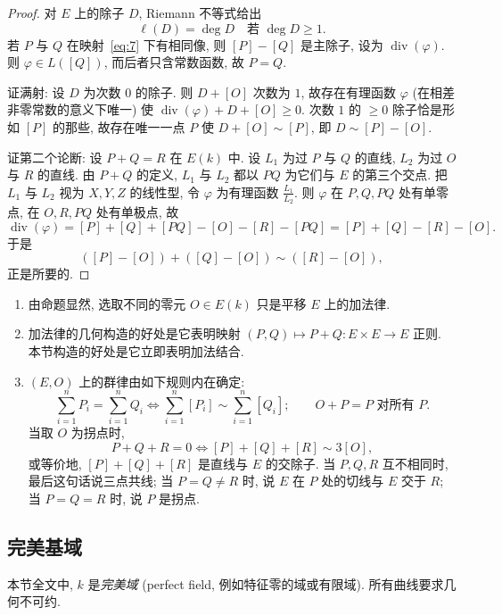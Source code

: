 \begin{proof}
对 $E$ 上的除子 $D$, Riemann 不等式给出
\[
\ell(D) = \deg D \quad \text{若 } \deg D\ge 1.
\]
若 $P$ 与 $Q$ 在映射~\eqref{eq:7} 下有相同像, 则 $[P] - [Q]$ 是主除子, 设为 $\operatorname{div}(\varphi)$. 则 $\varphi\in L([Q])$, 而后者只含常数函数, 故 $P = Q$.

证满射: 设 $D$ 为次数 $0$ 的除子. 则 $D + [O]$ 次数为 $1$, 故存在有理函数 $\varphi$ (在相差非零常数的意义下唯一) 使 $\operatorname{div}(\varphi) + D + [O]\ge 0$. 次数 $1$ 的 $\ge 0$ 除子恰是形如 $[P]$ 的那些, 故存在唯一一点 $P$ 使 $D + [O]\sim[P]$, 即 $D\sim[P] - [O]$.

证第二个论断: 设 $P + Q = R$ 在 $E(k)$ 中. 设 $L_1$ 为过 $P$ 与 $Q$ 的直线, $L_2$ 为过 $O$ 与 $R$ 的直线. 由 $P+Q$ 的定义, $L_1$ 与 $L_2$ 都以 $PQ$ 为它们与 $E$ 的第三个交点. 把 $L_1$ 与 $L_2$ 视为 $X,Y,Z$ 的线性型, 令 $\varphi$ 为有理函数 $\frac{L_1}{L_2}$. 则 $\varphi$ 在 $P, Q, PQ$ 处有单零点, 在 $O, R, PQ$ 处有单极点, 故
\[
\operatorname{div}(\varphi) = [P] + [Q] + [PQ] - [O] - [R] - [PQ] = [P] + [Q] - [R] - [O].
\]
于是
\[
([P] - [O]) + ([Q] - [O]) \sim ([R] - [O]),
\]
正是所要的.
\end{proof}

\begin{remark} \label{thm:1.4.11} 
\begin{enumerate}[label=\textup{(\alph*)}]
\item 由命题显然, 选取不同的零元 $O\in E(k)$ 只是平移 $E$ 上的加法律.
\item 加法律的几何构造的好处是它表明映射 $(P,Q)\mapsto P+Q\colon E\times E\to E$ 正则. 本节构造的好处是它立即表明加法结合.
\item $(E,O)$ 上的群律由如下规则内在确定:
\[
\sum_{i=1}^n P_i = \sum_{i=1}^n Q_i \iff \sum_{i=1}^n[P_i]\sim\sum_{i=1}^n[Q_i]; \qquad
O + P = P \text{ 对所有 } P.
\]
当取 $O$ 为拐点时,
\[
P + Q + R = 0 \iff [P] + [Q] + [R]\sim 3[O],
\]
或等价地, $[P] + [Q] + [R]$ 是直线与 $E$ 的交除子. 当 $P,Q,R$ 互不相同时, 最后这句话说三点共线; 当 $P = Q\neq R$ 时, 说 $E$ 在 $P$ 处的切线与 $E$ 交于 $R$; 当 $P = Q = R$ 时, 说 $P$ 是拐点.
\end{enumerate}
\end{remark}

\subsection*{完美基域}

本节全文中, $k$ 是\textit{完美域} (perfect field, 例如特征零的域或有限域). 所有曲线要求几何不可约.

